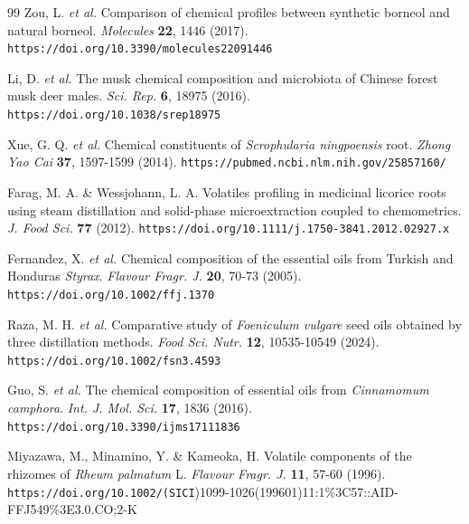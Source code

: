 \documentclass[11pt]{article}
\begin{document}
\begin{thebibliography}{99}
Zou, L. \emph{et al.} Comparison of chemical profiles between synthetic borneol and natural borneol. \emph{Molecules} \textbf{22}, 1446 (2017). \nolinkurl{https://doi.org/10.3390/molecules22091446}

Li, D. \emph{et al.} The musk chemical composition and microbiota of Chinese forest musk deer males. \emph{Sci. Rep.} \textbf{6}, 18975 (2016). \nolinkurl{https://doi.org/10.1038/srep18975}

Xue, G. Q. \emph{et al.} Chemical constituents of \emph{Scrophularia ningpoensis} root. \emph{Zhong Yao Cai} \textbf{37}, 1597-1599 (2014). \nolinkurl{https://pubmed.ncbi.nlm.nih.gov/25857160/}

Farag, M. A. \& Wessjohann, L. A. Volatiles profiling in medicinal licorice roots using steam distillation and solid-phase microextraction coupled to chemometrics. \emph{J. Food Sci.} \textbf{77} (2012). \nolinkurl{https://doi.org/10.1111/j.1750-3841.2012.02927.x}

Fernandez, X. \emph{et al.} Chemical composition of the essential oils from Turkish and Honduras \emph{Styrax}. \emph{Flavour Fragr. J.} \textbf{20}, 70-73 (2005). \nolinkurl{https://doi.org/10.1002/ffj.1370}

Raza, M. H. \emph{et al.} Comparative study of \emph{Foeniculum vulgare} seed oils obtained by three distillation methods. \emph{Food Sci. Nutr.} \textbf{12}, 10535-10549 (2024). \nolinkurl{https://doi.org/10.1002/fsn3.4593}

Guo, S. \emph{et al.} The chemical composition of essential oils from \emph{Cinnamomum camphora}. \emph{Int. J. Mol. Sci.} \textbf{17}, 1836 (2016). \nolinkurl{https://doi.org/10.3390/ijms17111836}

Miyazawa, M., Minamino, Y. \& Kameoka, H. Volatile components of the rhizomes of \emph{Rheum palmatum} L. \emph{Flavour Fragr. J.} \textbf{11}, 57-60 (1996). \nolinkurl{https://doi.org/10.1002/(SICI})1099-1026(199601)11:1\%3C57::AID-FFJ549\%3E3.0.CO;2-K

\end{thebibliography}

\clearpage
\end{document}
